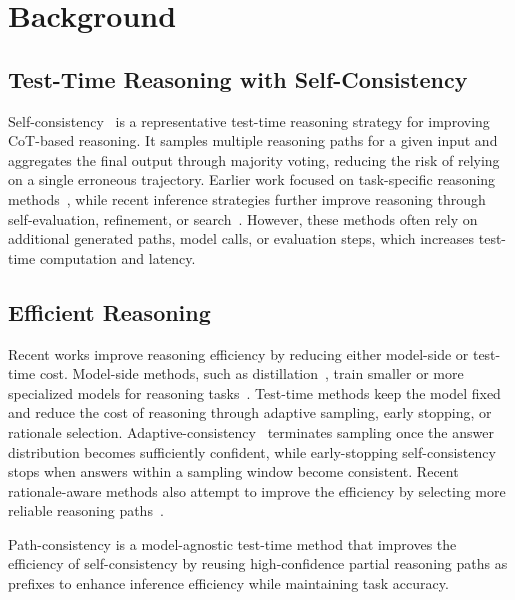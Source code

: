 \vspace{-2mm}
\section{Background}
\vspace{-2mm}

\subsection{Test-Time Reasoning with Self-Consistency}

Self-consistency~\cite{wang2022self} is a representative test-time reasoning strategy for improving CoT-based reasoning. It samples multiple reasoning paths for a given input and aggregates the final output through majority voting, reducing the risk of relying on a single erroneous trajectory. Earlier work focused on task-specific reasoning methods~\cite{andor2019giving, ran2019numnet, geva2020injecting, pikekos2021measuring}, while recent inference strategies further improve reasoning through self-evaluation, refinement, or search~\cite{zhang2023coder, shinn2023reflexion, madaan2024self, paul2024refiner, xie2024self, zhu2024deductive}. However, these methods often rely on additional generated paths, model calls, or evaluation steps, which increases test-time computation and latency.

\vspace{-1mm}
\subsection{Efficient Reasoning}

Recent works improve reasoning efficiency by reducing either model-side or test-time cost. Model-side methods, such as distillation~\cite{hinton2015distilling}, train smaller or more specialized models for reasoning tasks~\cite{fu2023specializing, ho2023large, magister2023teaching, li2023symbolic}. Test-time methods keep the model fixed and reduce the cost of reasoning through adaptive sampling, early stopping, or rationale selection. Adaptive-consistency~\cite{aggarwal2023let} terminates sampling once the answer distribution becomes sufficiently confident, while early-stopping self-consistency~\cite{liescape} stops when answers within a sampling window become consistent. Recent rationale-aware methods also attempt to improve the efficiency by selecting more reliable reasoning paths~\cite{wan2025rasc}.

Path-consistency is a model-agnostic test-time method that improves the efficiency of self-consistency by reusing high-confidence partial reasoning paths as prefixes to enhance inference efficiency while maintaining task accuracy.